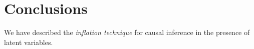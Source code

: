 \documentclass[aps,english,10pt,superscriptaddress,onecolumn,twoside,longbibliography,pra,floatfix,fleqn,nofootinbib]{revtex4-1}%
\theoremstyle{definition}
\begin{document}






\section{Conclusions}

We have described the \emph{inflation technique} for causal inference in the presence of latent variables.
\end{document}

